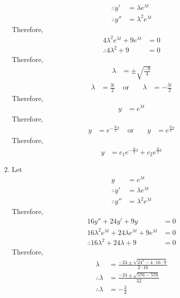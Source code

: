 \documentclass[fleqn, a4paper, 11pt, oneside]{amsart}
\theoremstyle{definition}
\theoremstyle{theorem}
\begin{document}
\begin{solution}
\begin{enumerate}[leftmargin = *]
\begin{align*}
				\therefore y'  & = \lambda e^{\lambda t} \\
				\therefore y'' & = \lambda^2 e^{\lambda t}
			\end{align*}
			Therefore,
			\begin{align*}
				4 \lambda^2 e^{\lambda t} + 9 e^{\lambda t} & = 0 \\
				\therefore 4 \lambda^2 + 9                  & = 0
			\end{align*}
			Therefore,
			\begin{align*}
				\lambda & = \pm \sqrt{\frac{-9}{4}}
			\end{align*}
			\begin{align*}
				\lambda & = \frac{3 i}{2} & \text{ or } &  & \lambda & = -\frac{3 i}{2}
			\end{align*}
			Therefore,
			\begin{align*}
				y & = e^{\lambda t}
			\end{align*} 
			Therefore,
			\begin{align*}
				y & = e^{-\frac{3 i}{2} t} & \text{ or } &  & y & = e^{\frac{3 i}{2} t}
			\end{align*}
			Therefore,
			\begin{align*}
				y &= c_1 e^{-\frac{3 i}{2} t} + c_2 e^{\frac{3 i}{2} t}
			\end{align*}
		\item
			Let
			\begin{align*}
				y              & = e^{\lambda t}         \\
				\therefore y'  & = \lambda e^{\lambda t} \\
				\therefore y'' & = \lambda^2 e^{\lambda t}
			\end{align*}
			Therefore,
			\begin{align*}
				16y'' + 24 y' + 9 y                                                     & = 0 \\
				16 \lambda^2 e^{\lambda t} + 24 \lambda e^{\lambda t} + 9 e^{\lambda t} & = 0 \\
				\therefore 16 \lambda^2 + 24 \lambda + 9                                & = 0
			\end{align*}
			Therefore,
			\begin{align*}
				\lambda            & = \frac{-24 \pm \sqrt{24^2 - 4 \cdot 16 \cdot 9}}{2 \cdot 16} \\
				\therefore \lambda & = \frac{-24 \pm \sqrt{576 - 576}}{32}                         \\
				\therefore \lambda & = -\frac{3}{4}
			\end{align*}

\end{enumerate}
\end{solution}
\end{document}
